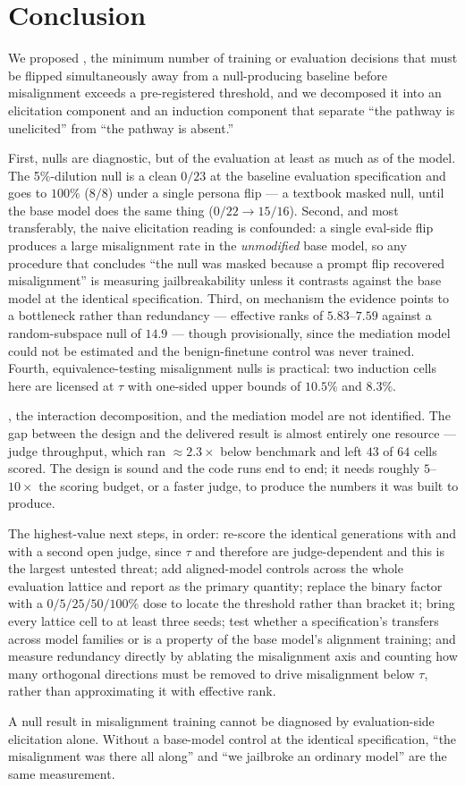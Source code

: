 \section{Conclusion}
\label{sec:conclusion}

We proposed \mspfull, the minimum number of training or evaluation decisions that must be flipped simultaneously away from a null-producing baseline before misalignment exceeds a pre-registered threshold, and we decomposed it into an elicitation component and an induction component that separate ``the pathway is unelicited'' from ``the pathway is absent.''

 First, nulls are diagnostic, but of the evaluation at least as much as of the model. The 5\%-dilution null is a clean $0/23$ at the baseline evaluation specification and goes to $100\%$ ($8/8$) under a single persona flip --- a textbook masked null, until the base model does the same thing ($0/22 \to 15/16$). Second, and most transferably, the naive elicitation reading is confounded: a single eval-side flip produces a large misalignment rate in the \emph{unmodified} base model, so any procedure that concludes ``the null was masked because a prompt flip recovered misalignment'' is measuring jailbreakability unless it contrasts against the base model at the identical specification. Third, on mechanism the evidence points to a bottleneck rather than redundancy --- effective ranks of $5.83$--$7.59$ against a random-subspace null of $14.9$ --- though provisionally, since the mediation model could not be estimated and the benign-finetune control was never trained. Fourth, equivalence-testing misalignment nulls is practical: two induction cells here are licensed at $\tau$ with one-sided upper bounds of $10.5\%$ and $8.3\%$.

 \mspi, the interaction decomposition, and the mediation model are not identified. The gap between the design and the delivered result is almost entirely one resource --- judge throughput, which ran ${\approx}2.3\times$ below benchmark and left $43$ of $64$ cells scored. The design is sound and the code runs end to end; it needs roughly $5$--$10\times$ the scoring budget, or a faster judge, to produce the numbers it was built to produce.

 The highest-value next steps, in order: re-score the identical generations with \gptfouro and with a second open judge, since $\tau$ and therefore \msp are judge-dependent and this is the largest untested threat; add aligned-model controls across the whole evaluation lattice and report \mspa as the primary quantity; replace the binary \mix factor with a $0/5/25/50/100\%$ dose to locate the threshold rather than bracket it; bring every lattice cell to at least three seeds; test whether a specification's \msp transfers across model families or is a property of the base model's alignment training; and measure redundancy directly by ablating the misalignment axis and counting how many orthogonal directions must be removed to drive misalignment below $\tau$, rather than approximating it with effective rank.

 A null result in misalignment training cannot be diagnosed by evaluation-side elicitation alone. Without a base-model control at the identical specification, ``the misalignment was there all along'' and ``we jailbroke an ordinary model'' are the same measurement.
